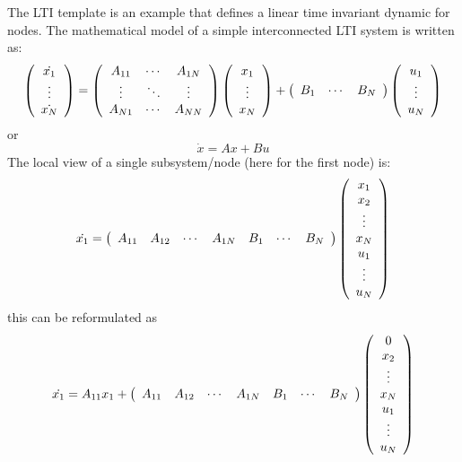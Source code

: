 \documentclass[a4paper,twoside, openright,12pt]{report}
\begin{document}
The LTI template is an example that defines a linear time invariant dynamic for nodes. The mathematical model 
of a simple interconnected LTI system is written as:
\begin{eqnarray}
\left( \begin{array}{c}
\dot{x_1} \\  
\vdots \\
\dot{x_N}
\end{array} \right)=
\left( \begin{array}{ccc}
A_{11} & \cdots & A_{1N} \\  
\vdots & \ddots & \vdots\\
A_{N1} & \cdots &A_{NN}
\end{array} \right) 
\left( \begin{array}{c}
x_1 \\  
\vdots \\
x_N
\end{array} \right)+
\left( \begin{array}{c c c}
B_{1} & \cdots & B_{N}  
\end{array} \right) 
\left( \begin{array}{c}
u_1 \\  
\vdots \\
u_N
\end{array} \right)       
\end{eqnarray}
or
\begin{equation}
 \dot{x}=Ax+Bu
\end{equation}
The local view of a single subsystem/node (here for the first node) is:
\begin{eqnarray}
  \dot{x_1}= 
\left( \begin{array}{c c c c c c c}
A_{11} & A_{12} & \cdots & A_{1N} & B_{1} & \cdots & B_{N}  
\end{array} \right) 
\left( \begin{array}{c}
x_1 \\ 
x_2 \\ 
\vdots \\
x_N\\
u_1 \\  
\vdots \\
u_N
\end{array} \right)    
\end{eqnarray}
this can be reformulated as
\begin{eqnarray} \label{LTIFor}
 \dot{x_1}= A_{11}x_1 +  
\left( \begin{array}{c c c c c c c}
A_{11} & A_{12} & \cdots & A_{1N} & B_{1} & \cdots & B_{N}  
\end{array} \right) 
\left( \begin{array}{c}
0 \\ 
x_2 \\ 
\vdots \\
x_N\\
u_1 \\  
\vdots \\
u_N
\end{array} \right) 
\end{eqnarray}
\end{document}
